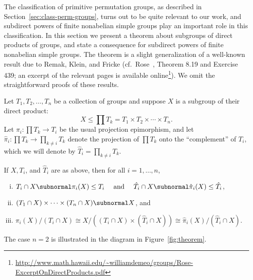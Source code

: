 The classification of primitive permutation groups, as 
described in Section~\ref{sec:class-perm-groups}, turns out to be quite relevant
to our work, and subdirect powers of finite nonabelian simple groups play an
important role in this classification.
In this section we present a theorem about subgroups of direct products of
groups, and state a consequence for subdirect powers of finite nonabelian
simple groups.  The theorem is a slight generalization of a well-known result
due to Remak, Klein, and Fricke (cf.~Rose~\cite{Rose:1978}, Theorem 
8.19 and Exercise 439; an excerpt of the relevant pages is available 
online\footnote{\url{http://www.math.hawaii.edu/~williamdemeo/groups/Rose-ExcerptOnDirectProducts.pdf}}).
We omit the straightforward proofs of these results. 

Let $T_1, T_2, \dots, T_n$ be a collection of groups and suppose $X$ is a
subgroup of their direct product:
\[
X \leq \prod T_k = T_1 \times T_2 \times \cdots \times T_n.  
\]
Let $\pi_i: \prod T_k \rightarrow T_i$ be the usual projection
epimorphism, and let $\hat{\pi}_i : \prod T_k \rightarrow \prod\limits_{k\neq i} T_k$ denote the
projection of  $\prod T_k$ onto the ``complement'' of $T_i$, which we will
denote by $\hat{T}_i = \prod\limits_{k\neq i}T_k$.
\begin{theorem}
\label{thm:1} If $X, T_i$, and $\hat{T}_i$ are as above, 
 then for all $i=1,\dots, n$, 
  \begin{enumerate}[(i)]
  \item $T_i \cap X \subnormal \pi_i(X) \leq T_i \quad \text{ and } \quad 
\hat{T}_i\cap X \subnormal \hat{\pi}_i(X)\leq \hat{T}_i$,
\item  $(T_1\cap X) \times \cdots \times (T_n\cap X) \subnormal X$, and
\item
$\pi_i(X) /(T_i \cap X)\cong 
X/\left((T_i\cap X) \times (\hat{T}_i\cap X)\right) \cong 
\hat{\pi}_i(X) /(\hat{T}_i\cap X).$
  \end{enumerate}
\end{theorem}
The case $n=2$ is illustrated in the diagram
in Figure~\ref{fig:theorem}.

